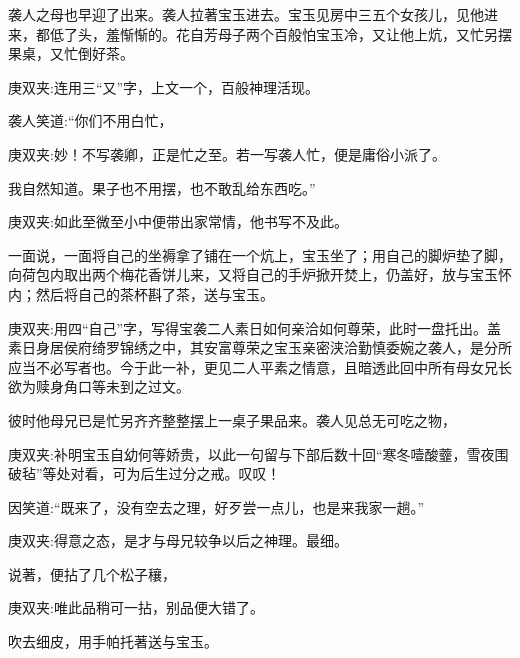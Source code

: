 \begin{parag}
    袭人之母也早迎了出来。袭人拉著宝玉进去。宝玉见房中三五个女孩儿，见他进来，都低了头，羞惭惭的。花自芳母子两个百般怕宝玉冷，又让他上炕，又忙另摆果桌，又忙倒好茶。\begin{note}庚双夹:连用三“又”字，上文一个，百般神理活现。\end{note}袭人笑道:“你们不用白忙，\begin{note}庚双夹:妙！不写袭卿，正是忙之至。若一写袭人忙，便是庸俗小派了。\end{note}我自然知道。果子也不用摆，也不敢乱给东西吃。”\begin{note}庚双夹:如此至微至小中便带出家常情，他书写不及此。\end{note}一面说，一面将自己的坐褥拿了铺在一个炕上，宝玉坐了；用自己的脚炉垫了脚，向荷包内取出两个梅花香饼儿来，又将自己的手炉掀开焚上，仍盖好，放与宝玉怀内；然后将自己的茶杯斟了茶，送与宝玉。\begin{note}庚双夹:用四“自己”字，写得宝袭二人素日如何亲洽如何尊荣，此时一盘托出。盖素日身居侯府绮罗锦绣之中，其安富尊荣之宝玉亲密浃洽勤慎委婉之袭人，是分所应当不必写者也。今于此一补，更见二人平素之情意，且暗透此回中所有母女兄长欲为赎身角口等未到之过文。\end{note}彼时他母兄已是忙另齐齐整整摆上一桌子果品来。袭人见总无可吃之物，\begin{note}庚双夹:补明宝玉自幼何等娇贵，以此一句留与下部后数十回“寒冬噎酸虀，雪夜围破毡”等处对看，可为后生过分之戒。叹叹！\end{note}因笑道:“既来了，没有空去之理，好歹尝一点儿，也是来我家一趟。”\begin{note}庚双夹:得意之态，是才与母兄较争以后之神理。最细。\end{note}说著，便拈了几个松子穰，\begin{note}庚双夹:唯此品稍可一拈，别品便大错了。\end{note}吹去细皮，用手帕托著送与宝玉。
\end{parag}


